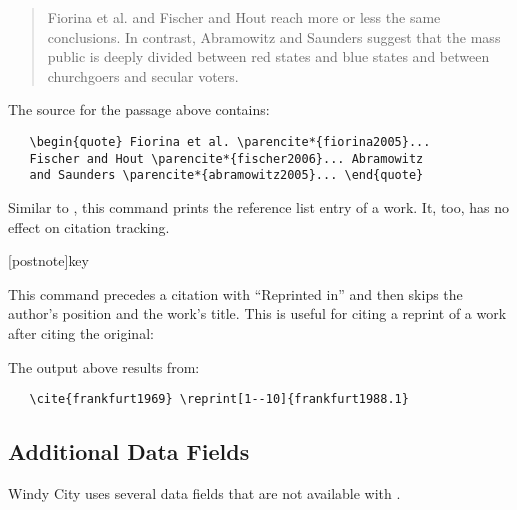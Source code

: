\documentclass[11pt,letterpaper,oneside]{article}
\begin{document}
\begin{ltxsyntax}
\begin{quote} Fiorina et al. \parencite*{fiorina2005} and Fischer and
Hout \parencite*{fischer2006} reach more or less the same conclusions.
In contrast, Abramowitz and Saunders \parencite*{abramowitz2005}
suggest that the mass public is deeply divided between red states and
blue states and between churchgoers and secular voters. \end{quote}

The source for the passage above contains:

\begin{verbatim}
   \begin{quote} Fiorina et al. \parencite*{fiorina2005}...
   Fischer and Hout \parencite*{fischer2006}... Abramowitz
   and Saunders \parencite*{abramowitz2005}... \end{quote}
\end{verbatim}


Similar to , this command prints the reference list
entry of a work. It, too, has no effect on citation tracking.

[postnote]{key}

This command precedes a citation with ``Reprinted in'' and then skips
the author's position and the work's title. This is useful for citing
a reprint of a work after citing the original:

\begin{citebib}
\item \cite{frankfurt1969} 
\end{citebib}

\noindent The output above results from:

\begin{verbatim}
   \cite{frankfurt1969} \reprint[1--10]{frankfurt1988.1}
\end{verbatim}

\end{ltxsyntax}

\subsection{Additional Data Fields}
\label{datafields}

Windy City uses several data fields that are not available with
\biblatex.
\end{document}
